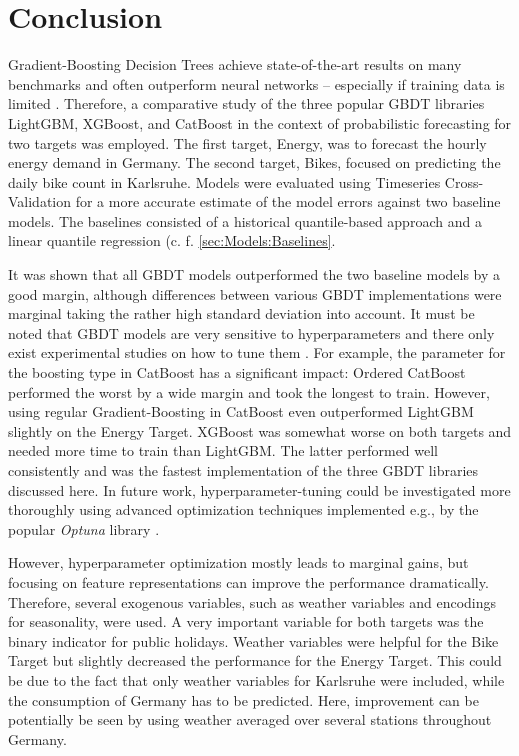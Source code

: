 \newpage
\section{Conclusion}
\label{ch:Conclusion}

Gradient-Boosting Decision Trees achieve state-of-the-art results on many benchmarks and often outperform neural networks -- especially if training data is limited \parencites{shwartz-ziv_tabular_2021, grinsztajn_why_2022}. Therefore, a comparative study of the three popular GBDT libraries LightGBM, XGBoost, and CatBoost in the context of probabilistic forecasting for two targets was employed. The first target, Energy, was to forecast the hourly energy demand in Germany. The second target, Bikes, focused on predicting the daily bike count in Karlsruhe. Models were evaluated using Timeseries Cross-Validation for a more accurate estimate of the model errors against two baseline models. The baselines consisted of a historical quantile-based approach and a linear quantile regression (c. f. \cref{sec:Models:Baselines}.

It was shown that all GBDT models outperformed the two baseline models by a good margin, although differences between various GBDT implementations were marginal taking the rather high standard deviation into account. It must be noted that GBDT models are very sensitive to hyperparameters and there only exist experimental studies on how to tune them \parencites{florek_benchmarking_2023, bentejac_comparative_2021}. For example, the parameter for the boosting type in CatBoost has a significant impact: Ordered CatBoost performed the worst by a wide margin and took the longest to train. However, using regular Gradient-Boosting in CatBoost even outperformed LightGBM slightly on the Energy Target. XGBoost was somewhat worse on both targets and needed more time to train than LightGBM. The latter performed well consistently and was the fastest implementation of the three GBDT libraries discussed here. In future work, hyperparameter-tuning could be investigated more thoroughly using advanced optimization techniques implemented e.g., by the popular \textit{Optuna} library \parencite{akiba_optuna_2019}.

However, hyperparameter optimization mostly leads to marginal gains, but focusing on feature representations can improve the performance dramatically. Therefore, several exogenous variables, such as weather variables and encodings for seasonality, were used. A very important variable for both targets was the binary indicator for public holidays. Weather variables were helpful for the Bike Target but slightly decreased the performance for the Energy Target. This could be due to the fact that only weather variables for Karlsruhe were included, while the consumption of Germany has to be predicted. Here, improvement can be potentially be seen by using weather averaged over several stations throughout Germany.


